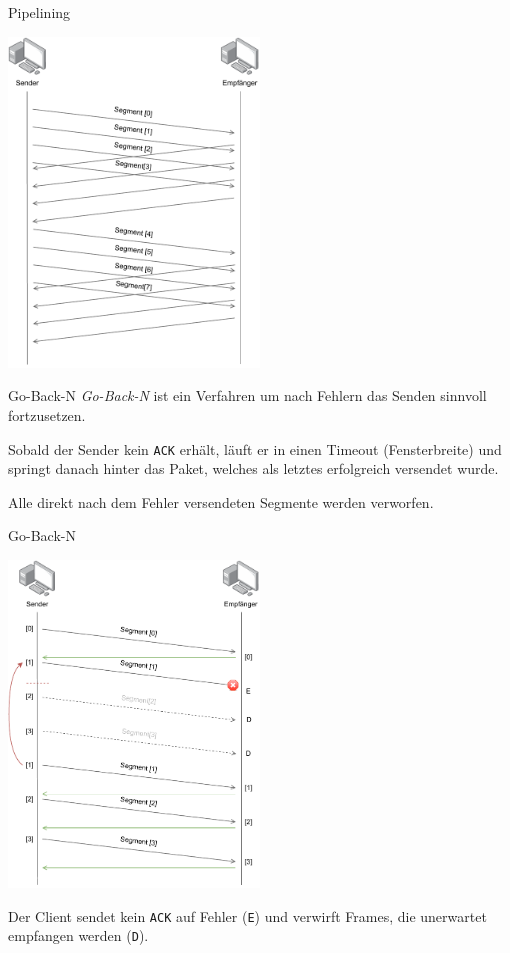 \begin{example}{Pipelining}
    \begin{center}
        \includegraphics[width=0.5\textwidth]{includes/figures/example_pipelining.pdf}
    \end{center}
\end{example}

\begin{defi}{Go-Back-N}
    \emph{Go-Back-N} ist ein Verfahren um nach Fehlern das Senden sinnvoll fortzusetzen.

    Sobald der Sender kein \texttt{ACK} erhält, läuft er in einen Timeout (Fensterbreite) und springt danach hinter das Paket, welches als letztes erfolgreich versendet wurde.

    Alle direkt nach dem Fehler versendeten Segmente werden verworfen.
\end{defi}

\begin{example}{Go-Back-N}
    \begin{center}
        \includegraphics[width=0.5\textwidth]{includes/figures/example_go_back_n.pdf}
    \end{center}

    Der Client sendet kein \texttt{ACK} auf Fehler (\texttt{E}) und verwirft Frames, die unerwartet empfangen werden (\texttt{D}).
\end{example}